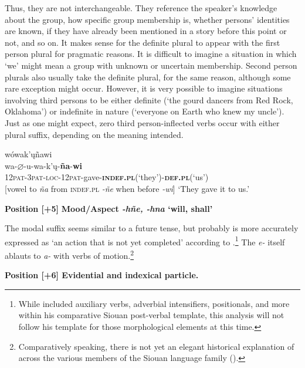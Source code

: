 \documentclass[output=paper]{LSP/langsci}
\begin{document}
Thus, they are not interchangeable.  They reference the speaker's knowledge about the group, how specific group membership is, whether persons' identities are known, if they have already been mentioned in a story before this point or not, and so on.  It makes sense for the definite plural to appear with the first person plural for pragmatic reasons.  It is difficult to imagine a situation in which `we' might mean a group with unknown or uncertain membership.  Second person plurals also usually take the definite plural, for the same reason, although some rare exception might occur.  However, it is very possible to imagine situations involving third persons to be either definite (`the gourd dancers from Red Rock, Oklahoma') or indefinite in nature (`everyone on Earth who knew my uncle').  Just as one might expect, zero third person-inflected verbs occur with either plural suffix, depending on the meaning intended. 

\begin{exe}
\ex \glll  wówak'\k{u}ñawi  \\
wa-\textbf{$\varnothing$}-u-wa-k'\k{u}-\textbf{ña}-\textbf{wi}    \\
\textsc{12pat-3pat-loc-12pat-}gave-\textbf{\textsc{indef.pl}}(`they')-\textbf{\textsc{def.pl}}(`us')  \\     

[vowel  to \textit{ña} from \textsc{indef.pl} \textit{-ñe} when before \textit{-wi}]
\trans `They gave it to us.'  \citep[240]{Whitman1947}
\end{exe} 

\textbf{Position [+5]} \textbf{Mood/Aspect \textit{-hñe, -hna} `will, shall'}

The modal suffix seems similar to a future tense, but probably is more accurately expressed as `an action that is not yet completed' according to \citet{Rankin2009}.\footnote{While \citet{Rankin2009} included auxiliary verbs, adverbial intensifiers, positionals, and more within his comparative Siouan post-verbal template, this analysis will not follow his template for those morphological elements at this time.}   The \textit{e-} itself ablauts to \textit{a-} with verbs of motion.\footnote{Comparatively speaking, there is not yet an elegant historical explanation of  across the various members of the Siouan language family (\citealt[466-468]{Rankin2005b}).}  

\vspace{1em}
\textbf{Position [+6]  Evidential and  indexical particle.}
\end{document}
